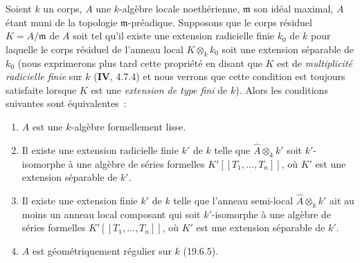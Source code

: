 \begin{proposition}[19.6.6]
\label{0.19.6.6-fr}
Soient $k$ un corps, $A$ une $k$-algèbre locale noethérienne, $\mathfrak m$ son
idéal maximal, $A$ étant muni de la topologie $\mathfrak m$-préadique.
Supposons que le corps résiduel $K=A/\mathfrak m$ de $A$ soit tel qu'il existe
une extension radicielle finie $k_0$ de $k$ pour laquelle le corps résiduel de
l'anneau local $K\otimes_k k_0$ soit une extension séparable de $k_0$ (nous
exprimerons plus tard cette propriété en disant que $K$ est de
\emph{multiplicité radicielle finie} sur $k$ ($\mathbf{IV}$, 4.7.4) et nous
verrons que cette condition est toujours satisfaite lorsque $K$ est une
\emph{extension de type fini} de $k$). Alors les conditions suivantes sont
équivalentes~:
\begin{enumerate}
  \item[a)] $A$ est une $k$-algèbre formellement lisse.
  \item[b)] Il existe une extension radicielle finie $k'$ de $k$ telle que
  $\widehat A\otimes_k k'$ soit $k'$-isomorphe à une algèbre de séries
  formelles $K'[[T_1,\ldots,T_n]]$, où $K'$ est une extension séparable de
  $k'$.
  \item[b')] Il existe une extension finie $k'$ de $k$ telle que l'anneau
  semi-local $\widehat A\otimes_k k'$ ait au moins un anneau local composant
  qui soit $k'$-isomorphe à une algèbre de séries formelles
  $K'[[T_1,\ldots,T_n]]$, où $K'$ est une extension séparable de $k'$.
  \item[c)] $A$ est géométriquement régulier sur $k$ (19.6.5).
\end{enumerate}
\end{proposition}

